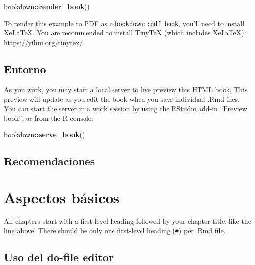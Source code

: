 \documentclass[
]{book}
\newenvironment{Shaded}{\begin{snugshade}}{\end{snugshade}}
\newcommand{\FunctionTok}[1]{\textcolor[rgb]{0.13,0.29,0.53}{\textbf{#1}}}
\newcommand{\NormalTok}[1]{#1}
\newcommand{\SpecialCharTok}[1]{\textcolor[rgb]{0.81,0.36,0.00}{\textbf{#1}}}
\theoremstyle{definition}
\theoremstyle{definition}
\theoremstyle{definition}
\theoremstyle{definition}
\theoremstyle{remark}
\begin{document}
\begin{Shaded}
\begin{Highlighting}[]
\NormalTok{bookdown}\SpecialCharTok{::}\FunctionTok{render\_book}\NormalTok{()}
\end{Highlighting}
\end{Shaded}

To render this example to PDF as a \texttt{bookdown::pdf\_book}, you'll need to install XeLaTeX. You are recommended to install TinyTeX (which includes XeLaTeX): \url{https://yihui.org/tinytex/}.

\hypertarget{entorno}{%
\section{Entorno}\label{entorno}}

As you work, you may start a local server to live preview this HTML book. This preview will update as you edit the book when you save individual .Rmd files. You can start the server in a work session by using the RStudio add-in ``Preview book'', or from the R console:

\begin{Shaded}
\begin{Highlighting}[]
\NormalTok{bookdown}\SpecialCharTok{::}\FunctionTok{serve\_book}\NormalTok{()}
\end{Highlighting}
\end{Shaded}

\hypertarget{recomendaciones}{%
\section{Recomendaciones}\label{recomendaciones}}

\hypertarget{aspectos-buxe1sicos}{%
\chapter{Aspectos básicos}\label{aspectos-buxe1sicos}}

All chapters start with a first-level heading followed by your chapter title, like the line above. There should be only one first-level heading (\texttt{\#}) per .Rmd file.

\hypertarget{uso-del-do-file-editor}{%
\section{Uso del do-file editor}\label{uso-del-do-file-editor}}
\end{document}
